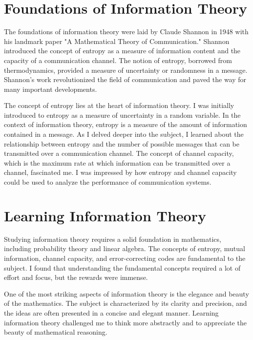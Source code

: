 \documentclass[a4paper,conference]{IEEEtran}
\begin{document}
\section{Foundations of Information Theory}

The foundations of information theory were laid by Claude Shannon in 1948 with his landmark paper "A Mathematical Theory of Communication." Shannon introduced the concept of entropy as a measure of information content and the capacity of a communication channel. The notion of entropy, borrowed from thermodynamics, provided a measure of uncertainty or randomness in a message. Shannon's work revolutionized the field of communication and paved the way for many important developments.

The concept of entropy lies at the heart of information theory. I was initially introduced to entropy as a measure of uncertainty in a random variable. In the context of information theory, entropy is a measure of the amount of information contained in a message. As I delved deeper into the subject, I learned about the relationship between entropy and the number of possible messages that can be transmitted over a communication channel. The concept of channel capacity, which is the maximum rate at which information can be transmitted over a channel, fascinated me. I was impressed by how entropy and channel capacity could be used to analyze the performance of communication systems.


\section{Learning Information Theory}
Studying information theory requires a solid foundation in mathematics, including probability theory and linear algebra. The concepts of entropy, mutual information, channel capacity, and error-correcting codes are fundamental to the subject. I found that understanding the fundamental concepts required a lot of effort and focus, but the rewards were immense.

One of the most striking aspects of information theory is the elegance and beauty of the mathematics. The subject is characterized by its clarity and precision, and the ideas are often presented in a concise and elegant manner. Learning information theory challenged me to think more abstractly and to appreciate the beauty of mathematical reasoning.




\end{document}
